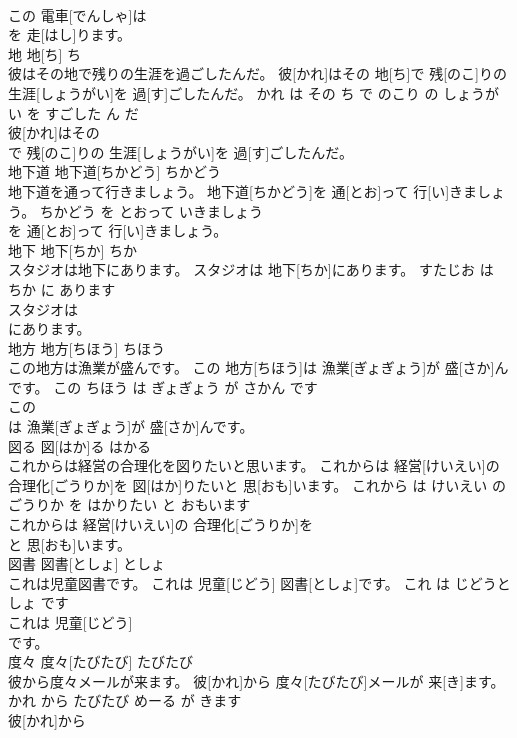 \documentclass[8pt]{extreport}
\begin{document}
\begin{CJK}{UTF8}{min}
\\	この 電車[でんしゃ]は
\\	を 走[はし]ります。			
\\	地	地[ち]	ち	
\\	彼はその地で残りの生涯を過ごしたんだ。	彼[かれ]はその 地[ち]で 残[のこ]りの 生涯[しょうがい]を 過[す]ごしたんだ。	かれ は その ち で のこり の しょうがい を すごした ん だ	
\\	彼[かれ]はその
\\	で 残[のこ]りの 生涯[しょうがい]を 過[す]ごしたんだ。			
\\	地下道	地下道[ちかどう]	ちかどう	
\\	地下道を通って行きましょう。	地下道[ちかどう]を 通[とお]って 行[い]きましょう。	ちかどう を とおって いきましょう	
\\	を 通[とお]って 行[い]きましょう。			
\\	地下	地下[ちか]	ちか	
\\	スタジオは地下にあります。	スタジオは 地下[ちか]にあります。	すたじお は ちか に あります	
\\	スタジオは
\\	にあります。			
\\	地方	地方[ちほう]	ちほう	
\\	この地方は漁業が盛んです。	この 地方[ちほう]は 漁業[ぎょぎょう]が 盛[さか]んです。	この ちほう は ぎょぎょう が さかん です	
\\	この
\\	は 漁業[ぎょぎょう]が 盛[さか]んです。			
\\	図る	図[はか]る	はかる	
\\	これからは経営の合理化を図りたいと思います。	これからは 経営[けいえい]の 合理化[ごうりか]を 図[はか]りたいと 思[おも]います。	これから は けいえい の ごうりか を はかりたい と おもいます	
\\	これからは 経営[けいえい]の 合理化[ごうりか]を
\\	と 思[おも]います。			
\\	図書	図書[としょ]	としょ	
\\	これは児童図書です。	これは 児童[じどう] 図書[としょ]です。	これ は じどうとしょ です	
\\	これは 児童[じどう]
\\	です。			
\\	度々	度々[たびたび]	たびたび	
\\	彼から度々メールが来ます。	彼[かれ]から 度々[たびたび]メールが 来[き]ます。	かれ から たびたび めーる が きます	
\\	彼[かれ]から

\end{CJK}
\end{document}
